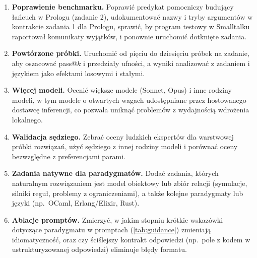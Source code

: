 \begin{enumerate}
  \item \textbf{Poprawienie benchmarku.} Poprawić predykat pomocniczy budujący łańcuch w Prologu
    (zadanie 2), udokumentować nazwy i tryby argumentów w kontrakcie zadania 1 dla Prologu, sprawić,
    by program testowy w Smalltalku raportował komunikaty wyjątków, i ponownie uruchomić dotknięte
    zadania.
  \item \textbf{Powtórzone próbki.} Uruchomić od pięciu do dziesięciu próbek na zadanie, aby
    oszacować pass@$k$ i przedziały ufności, a wyniki analizować z zadaniem i językiem jako efektami
    losowymi i stałymi.
  \item \textbf{Więcej modeli.} Ocenić większe modele (Sonnet, Opus) i inne rodziny modeli, w tym
    modele o otwartych wagach udostępniane przez hostowanego dostawcę inferencji, co pozwala uniknąć
    problemów z wydajnością wdrożenia lokalnego.
  \item \textbf{Walidacja sędziego.} Zebrać oceny ludzkich ekspertów dla warstwowej próbki
    rozwiązań, użyć sędziego z innej rodziny modeli i porównać oceny bezwzględne z preferencjami
    parami.
  \item \textbf{Zadania natywne dla paradygmatów.} Dodać zadania, których naturalnym rozwiązaniem
    jest model obiektowy lub zbiór relacji (symulacje, silniki reguł, problemy z ograniczeniami),
    a także kolejne paradygmaty lub języki (np.\ OCaml, Erlang/Elixir, Rust).
  \item \textbf{Ablacje promptów.} Zmierzyć, w jakim stopniu krótkie wskazówki dotyczące paradygmatu
    w promptach (\cref{tab:guidance}) zmieniają idiomatyczność, oraz czy ściślejszy kontrakt
    odpowiedzi (np.\ pole z kodem w ustrukturyzowanej odpowiedzi) eliminuje błędy formatu.
\end{enumerate}
